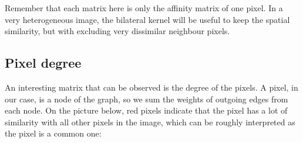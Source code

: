 Remember that each matrix here is only the affinity matrix of one pixel.
In a very heterogeneous image, the bilateral kernel will be useful to keep the spatial similarity, but with excluding very dissimilar neighbour pixels.

\subsection{Pixel degree}

An interesting matrix that can be observed is the degree of the pixels.
A pixel, in our case, is a node of the graph, so we sum the weights of outgoing edges from each node.
On the picture below, red pixels indicate that the pixel has a lot of similarity with all other pixels in the image, which can be roughly interpreted as the pixel is a common one:

